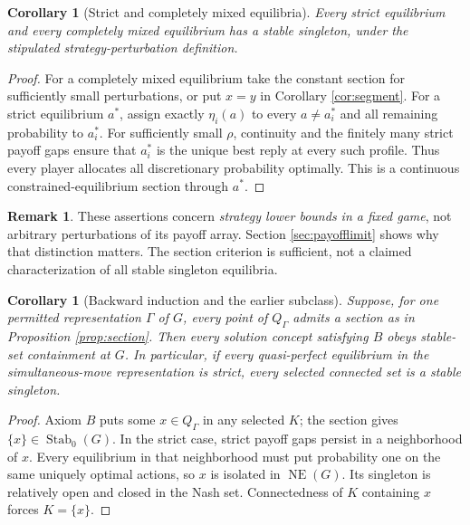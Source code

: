 \documentclass[11pt]{article}
\newtheorem{corollary}[theorem]{Corollary}
\theoremstyle{definition}
\newtheorem{remark}[theorem]{Remark}
\newcommand{\NE}{\operatorname{NE}}
\newcommand{\Stab}{\operatorname{Stab}_0}
\begin{document}
\begin{corollary}[Strict and completely mixed equilibria]\label{cor:strict}
Every strict equilibrium and every completely mixed equilibrium has a stable
singleton, under the stipulated strategy-perturbation definition.
\end{corollary}
\begin{proof}
For a completely mixed equilibrium take the constant section for sufficiently
small perturbations, or put $x=y$ in Corollary \ref{cor:segment}.
For a strict equilibrium $a^*$, assign exactly $\eta_i(a)$ to every
$a\ne a_i^*$ and all remaining probability to $a_i^*$. For sufficiently small
$\rho$, continuity and the finitely many strict payoff gaps ensure that
$a_i^*$ is the unique best reply at every such profile. Thus every player
allocates all discretionary probability optimally. This is a continuous
constrained-equilibrium section through $a^*$.
\end{proof}

\begin{remark}
These assertions concern \emph{strategy lower bounds in a fixed game}, not
arbitrary perturbations of its payoff array. Section \ref{sec:payofflimit}
shows why that distinction matters. The section criterion is sufficient,
not a claimed characterization of all stable singleton equilibria.
\end{remark}

\begin{corollary}[Backward induction and the earlier subclass]\label{cor:Bsection}
Suppose, for one permitted representation $\Gamma$ of $G$, every point of
$Q_\Gamma$ admits a section as in Proposition \ref{prop:section}. Then every
solution concept satisfying $B$ obeys stable-set containment at $G$.
In particular, if every quasi-perfect equilibrium in the simultaneous-move
representation is strict, every selected connected set is a stable singleton.
\end{corollary}
\begin{proof}
Axiom $B$ puts some $x\in Q_\Gamma$ in any selected $K$; the section gives
$\{x\}\in\Stab(G)$. In the strict case, strict payoff gaps persist in a
neighborhood of $x$. Every equilibrium in that neighborhood must put
probability one on the same uniquely optimal actions, so $x$ is isolated in
$\NE(G)$. Its singleton is relatively open and closed in the Nash set.
Connectedness of $K$ containing $x$ forces $K=\{x\}$.
\end{proof}
\end{document}
